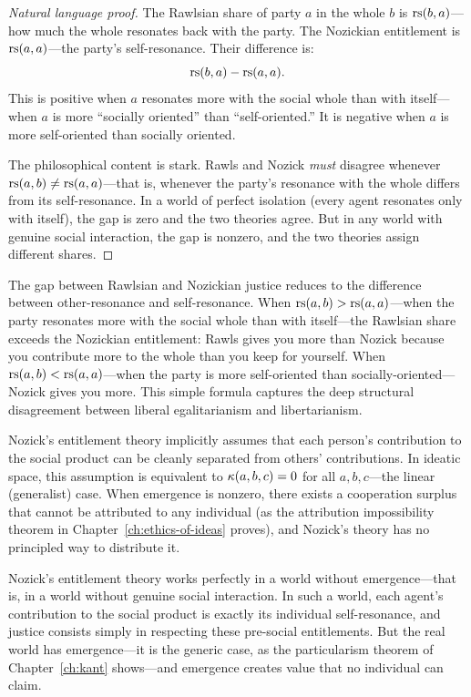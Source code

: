 \begin{proof}[Natural language proof]
The Rawlsian share of party $a$ in the whole $b$ is $\mathrm{rs}(b, a)$---how much
the whole resonates back with the party. The Nozickian entitlement is
$\mathrm{rs}(a, a)$---the party's self-resonance. Their difference is:
\[
  \mathrm{rs}(b, a) - \mathrm{rs}(a, a).
\]
This is positive when $a$ resonates more with the social whole than with
itself---when $a$ is more ``socially oriented'' than ``self-oriented.''
It is negative when $a$ is more self-oriented than socially oriented.

The philosophical content is stark. Rawls and Nozick \emph{must} disagree
whenever $\mathrm{rs}(a, b) \neq \mathrm{rs}(a, a)$---that is, whenever the party's
resonance with the whole differs from its self-resonance. In a world of
perfect isolation (every agent resonates only with itself), the gap is zero
and the two theories agree. But in any world with genuine social interaction,
the gap is nonzero, and the two theories assign different shares.
\end{proof}

\begin{interpretation}
The gap between Rawlsian and Nozickian justice reduces to the difference
between other-resonance and self-resonance. When $\mathrm{rs}(a,b) > \mathrm{rs}(a,a)$---when
the party resonates more with the social whole than with itself---the Rawlsian
share exceeds the Nozickian entitlement: Rawls gives you more than Nozick
because you contribute more to the whole than you keep for yourself. When
$\mathrm{rs}(a,b) < \mathrm{rs}(a,a)$---when the party is more self-oriented than
socially-oriented---Nozick gives you more. This simple formula captures the
deep structural disagreement between liberal egalitarianism and libertarianism.
\end{interpretation}

\begin{remark}
Nozick's entitlement theory implicitly assumes that each person's contribution
to the social product can be cleanly separated from others' contributions.
In ideatic space, this assumption is equivalent to $\kappa(a, b, c) = 0$
for all $a, b, c$---the linear (generalist) case. When emergence is nonzero,
there exists a cooperation surplus that cannot be attributed to any individual
(as the attribution impossibility theorem in Chapter~\ref{ch:ethics-of-ideas}
proves), and Nozick's theory has no principled way to distribute it.

Nozick's entitlement theory works perfectly in a world without emergence---that
is, in a world without genuine social interaction. In such a world, each
agent's contribution to the social product is exactly its individual
self-resonance, and justice consists simply in respecting these pre-social
entitlements. But the real world has emergence---it is the generic case,
as the particularism theorem of Chapter~\ref{ch:kant} shows---and emergence
creates value that no individual can claim.
\end{remark}

